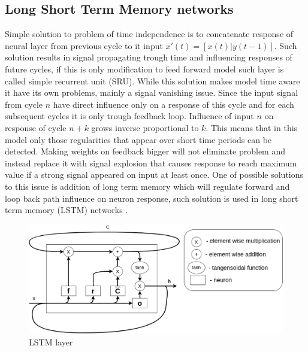 \documentclass{article}
\begin{document}
\subsection{Long Short Term Memory networks}
Simple solution to problem of time independence is to concatenate response of neural layer
from previous cycle to it input $x'(t)=[x(t)|y(t-1)]$.
Such solution results in signal propagating trough time and influencing responses of future cycles,
if this is only modification to feed forward model such layer is called simple recurrent
unit (SRU).
While this solution makes model time aware it have its own problems, mainly a signal vanishing
issue. Since the input signal from cycle $n$ have direct influence only on a response of this
cycle and for each subsequent cycles it is only trough feedback loop. Influence of input $n$ on
response of cycle $n+k$ grows inverse proportional to $k$.
This means that in this model only those regularities that appear over short time periods can
be detected.
Making weights on feedback bigger will not eliminate problem and instead replace it with signal
explosion that causes response to reach maximum value if a strong signal appeared on input at
least once.
One of possible solutions to this issue is addition of long term memory which will regulate
forward and loop back path influence on neuron response, such solution is used in long short
term memory (LSTM) networks \cite{Hochreiter1997}.
\begin{figure}[htb] 
\centering
	\includegraphics[width=\textwidth]{figures/lstm}
\caption{LSTM layer}
\label{fig:lstm}
\end{figure}

\end{document}
